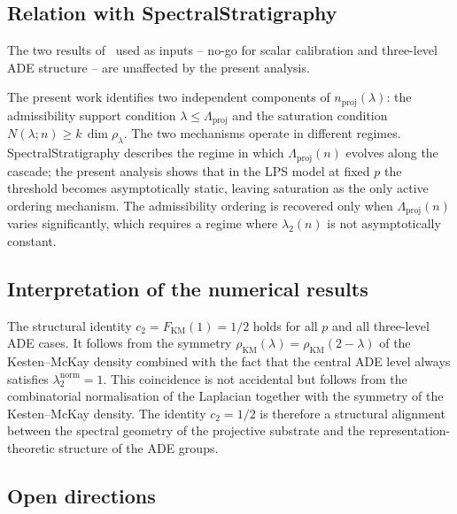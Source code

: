   \subsection{Relation with SpectralStratigraphy}
    \label{sec:disc:stratigraphy}

    The two results of~\cite{Beau2026a4} used as inputs -- no-go for
    scalar calibration and three-level ADE structure -- are unaffected by the
    present analysis.

    The present work identifies two independent components of
    $n_{\mathrm{proj}}(\lambda)$: the admissibility support condition
    $\lambda \leq \Lambda_{\mathrm{proj}}$ and the saturation condition
    $N(\lambda; n) \geq k\,\dim\rho_\lambda$.
    The two mechanisms operate in different regimes.
    SpectralStratigraphy describes the regime in which $\Lambda_{\mathrm{proj}}(n)$
    evolves along the cascade; the present analysis shows that in the LPS model
    at fixed $p$ the threshold becomes asymptotically static, leaving saturation
    as the only active ordering mechanism.
    The admissibility ordering is recovered only when $\Lambda_{\mathrm{proj}}(n)$
    varies significantly, which requires a regime where $\lambda_2(n)$ is not
    asymptotically constant.

  \subsection{Interpretation of the numerical results}
    \label{sec:disc:numerical}

    The structural identity $c_2 = F_{\mathrm{KM}}(1) = 1/2$ holds for all $p$
    and all three-level ADE cases.
    It follows from the symmetry $\rho_{\mathrm{KM}}(\lambda) =
\rho_{\mathrm{KM}}(2 - \lambda)$ of the Kesten--McKay density combined with
    the fact that the central ADE level always satisfies
    $\lambda_2^{\mathrm{norm}} = 1$.
    This coincidence is not accidental but follows from the combinatorial
    normalisation of the Laplacian together with the symmetry of the Kesten--McKay
    density.
    The identity $c_2 = 1/2$ is therefore a structural alignment between the
    spectral geometry of the projective substrate and the representation-theoretic
    structure of the ADE groups.

  \subsection{Open directions}
    \label{sec:disc:open}


